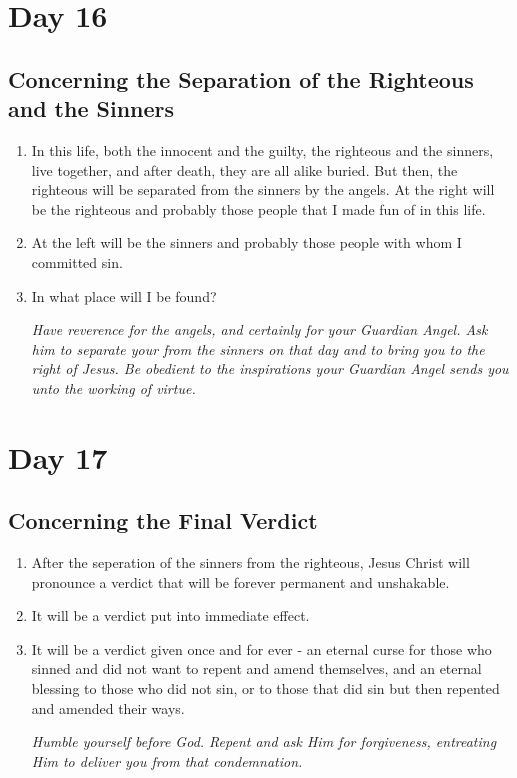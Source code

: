 \documentclass[11pt]{article}
\begin{document}
\section*{Day 16}
\label{sec:org2f49215}
\subsection*{Concerning the Separation of the Righteous and the Sinners}
\label{sec:org3558258}
\begin{enumerate}
\item In this life, both the innocent and the guilty, the righteous and the sinners, live together, and after death, they are all alike buried. But then, the righteous will be separated from the sinners by the angels. At the right will be the righteous and probably those people that I made fun of in this life.
\item At the left will be the sinners and probably those people with whom I committed sin.
\item In what place will I be found?

\emph{Have reverence for the angels, and certainly for your Guardian Angel. Ask him to separate your from the sinners on that day and to bring you to the right of Jesus. Be obedient to the inspirations your Guardian Angel sends you unto the working of virtue.}
\end{enumerate}
\section*{Day 17}
\label{sec:orgfda0d02}
\subsection*{Concerning the Final Verdict}
\label{sec:org56293a1}
\begin{enumerate}
\item After the seperation of the sinners from the righteous, Jesus Christ will pronounce a verdict that will be forever permanent and unshakable.
\item It will be a verdict put into immediate effect.
\item It will be a verdict given once and for ever - an eternal curse for those who sinned and did not want to repent and amend themselves, and an eternal
blessing to those who did not sin, or to those that did sin but then repented and amended their ways.

\emph{Humble yourself before God. Repent and ask Him for forgiveness, entreating Him to deliver you from that condemnation.}
\end{enumerate}
\end{document}
